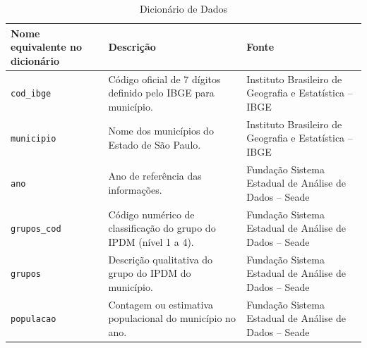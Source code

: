 \documentclass{article}
\begin{document}
\begin{table}[htbp]
  \centering
  \caption*{Dicionário de Dados} %
  \label{tab:dicionario_dados}
  \vspace{0.2cm}
  \begin{tabularx}{\textwidth}{l X X}
    \toprule
    \textbf{Nome equivalente no dicionário} & \textbf{Descrição} & \textbf{Fonte} \\
    \midrule
    \texttt{cod\_ibge} & Código oficial de 7 dígitos definido pelo IBGE para município. & Instituto Brasileiro de Geografia e Estatística -- IBGE \\
    \addlinespace
    \texttt{municipio} & Nome dos municípios do Estado de São Paulo. & Instituto Brasileiro de Geografia e Estatística -- IBGE \\
    \addlinespace
    \texttt{ano} & Ano de referência das informações. & Fundação Sistema Estadual de Análise de Dados -- Seade \\
    \addlinespace
    \texttt{grupos\_cod} & Código numérico de classificação do grupo do IPDM (nível 1 a 4). & Fundação Sistema Estadual de Análise de Dados -- Seade \\
    \addlinespace
    \texttt{grupos} & Descrição qualitativa do grupo do IPDM do município. & Fundação Sistema Estadual de Análise de Dados -- Seade \\
    \addlinespace
    \texttt{populacao} & Contagem ou estimativa populacional do município no ano. & Fundação Sistema Estadual de Análise de Dados -- Seade \\
    \bottomrule
  \end{tabularx}
\end{table}
\end{document}
